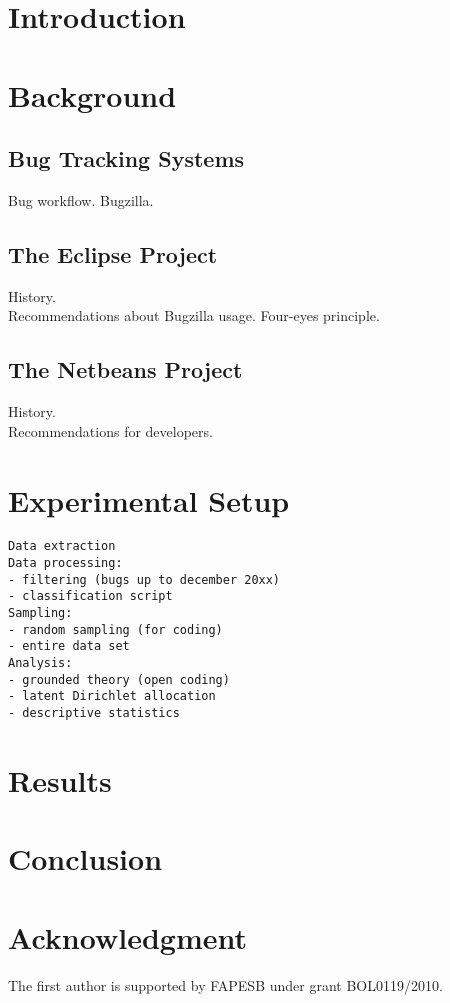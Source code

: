 \section{Introduction}

\section{Background}

\subsection{Bug Tracking Systems}
Bug workflow. Bugzilla. \cite{Bird2009}

\subsection{The Eclipse Project}
History. \\
Recommendations about Bugzilla usage. Four-eyes principle.

\subsection{The Netbeans Project}
History. \\
Recommendations for developers.

\section{Experimental Setup}

\begin{verbatim}
Data extraction
Data processing: 
- filtering (bugs up to december 20xx)
- classification script
Sampling:
- random sampling (for coding)
- entire data set
Analysis:
- grounded theory (open coding)
- latent Dirichlet allocation
- descriptive statistics
\end{verbatim}

\section{Results}

\section{Conclusion}

\section*{Acknowledgment}

The first author is supported by FAPESB under grant BOL0119/2010.
